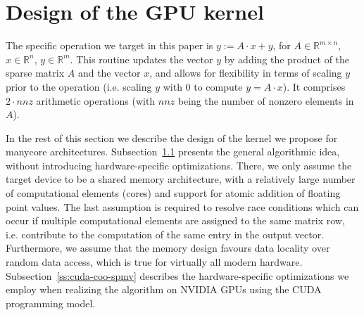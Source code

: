 \section{Design of the \coo \spmv GPU kernel}
\label{s3-kernel}


The specific \spmv operation we target in this paper is $y := A\cdot x + y$, 
for $A\in\mathbb{R}^{m\times n}$, $x\in\mathbb{R}^n$, $y\in\mathbb{R}^m$.
This routine updates the vector $y$
by adding the product of the sparse matrix $A$ and the vector $x$,
and allows for flexibility in terms of scaling $y$ prior to the
operation (i.e. scaling $y$ with 0 to compute $y=A\cdot x$).
It comprises $2\cdot nnz$ arithmetic operations (with $nnz$ being the number of nonzero elements in $A$).

In the rest of this section we describe the design of the \coo \spmv kernel we 
propose for manycore architectures.
Subsection~\ref{ss:coo-spmv} presents the general algorithmic idea, without
introducing hardware-specific optimizations.
There, we only assume the target device to be a shared memory 
architecture, with a relatively large number of
computational elements (cores) and support for atomic addition of floating
point values.
The last assumption is required to resolve race conditions which can occur if 
multiple computational elements are assigned to the same matrix row, i.e. 
contribute 
to the computation of the same entry in the output vector.
Furthermore, we assume that the memory design favours data locality over
random data access, which is true for virtually all modern hardware.
Subsection~\ref{ss:cuda-coo-spmv} describes the hardware-specific optimizations 
we employ when realizing the \coo \spmv algorithm on NVIDIA GPUs using 
the CUDA programming model.

\subsection{\coo \spmv}
\label{ss:coo-spmv}

